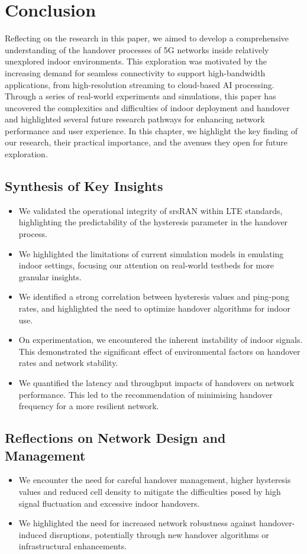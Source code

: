 \chapter{Conclusion}
Reflecting on the research in this paper, we aimed to develop a comprehensive understanding of the handover processes of 5G networks inside relatively unexplored indoor environments. This exploration was motivated by the increasing demand for seamless connectivity to support high-bandwidth applications, from high-resolution streaming to cloud-based AI processing. Through a series of real-world experiments and simulations, this paper has uncovered the complexities and difficulties of indoor deployment and handover and highlighted several future research pathways for enhancing network performance and user experience. In this chapter, we highlight the key finding of our research, their practical importance, and the avenues they open for future exploration.

\section{Synthesis of Key Insights}
\begin{itemize}
    \item We validated the operational integrity of srsRAN within LTE standards, highlighting the predictability of the hysteresis parameter in the handover process.
    \item We highlighted the limitations of current simulation models in emulating indoor settings, focusing our attention on real-world testbeds for more granular insights.
    \item We identified a strong correlation between hysteresis values and ping-pong rates, and highlighted the need to optimize handover algorithms for indoor use.
    \item On experimentation, we encountered the inherent instability of indoor signals. This demonstrated the significant effect of environmental factors on handover rates and network stability.
    \item We quantified the latency and throughput impacts of handovers on network performance. This led to the recommendation of minimising handover frequency for a more resilient network.
\end{itemize}

\section{Reflections on Network Design and Management}
\begin{itemize}
    \item We encounter the need for careful handover management, higher hysteresis values and reduced cell density to mitigate the difficulties posed by high signal fluctuation and excessive indoor handovers.
    \item We highlighted the need for increased network robustness against handover-induced disruptions, potentially through new handover algorithms or infrastructural enhancements.
\end{itemize}

